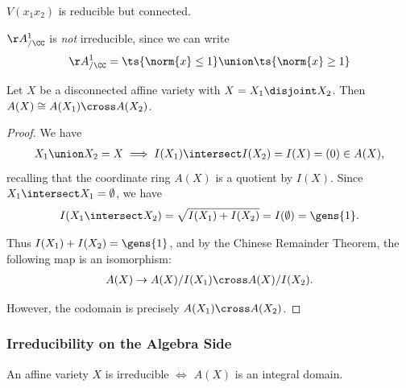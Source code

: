 \begin{example}

\(V(x_1 x_2)\) is reducible but connected.

\end{example}

\begin{example}

\(\AA^1_{/\CC}\) is \emph{not} irreducible, since we can write
\begin{align*}
\AA^1_{/\CC} = \ts{\norm{x} \leq 1} \union \ts{\norm{x} \geq 1}
\end{align*}

\end{example}

\begin{proposition}[?]

Let \(X\) be a disconnected affine variety with
\(X = X_1 \disjoint X_2\). Then \(A(X) \cong A(X_1) \cross A(X_2)\).

\end{proposition}

\begin{proof}

We have
\begin{align*}
X_1 \union X_2 = X \implies I(X_1) \intersect I(X_2) = I(X) = (0) \in A(X)
,\end{align*} recalling that the coordinate ring \(A(X)\) is a quotient
by \(I(X)\). Since \(X_1 \intersect X_1 = \emptyset\), we have
\begin{align*}  
I(X_1 \intersect X_2) = \sqrt{I(X_1) + I(X_2) } = I(\emptyset) = \gens{1}
.\end{align*}

Thus \(I(X_1) + I(X_2) = \gens{1}\), and by the Chinese Remainder
Theorem, the following map is an isomorphism:
\begin{align*}  
A(X) \to A(X)/I(X_1) \cross A(X) / I(X_2)
.\end{align*}

However, the codomain is precisely \(A(X_1) \cross A(X_2)\).

\end{proof}

\hypertarget{irreducibility-on-the-algebra-side}{%
\subsubsection{Irreducibility on the Algebra
Side}\label{irreducibility-on-the-algebra-side}}

\begin{proposition}[?]

An affine variety \(X\) is irreducible \(\iff\) \(A(X)\) is an integral
domain.

\end{proposition}

